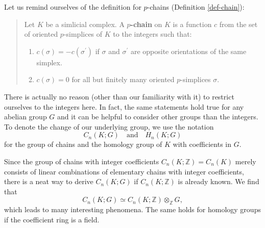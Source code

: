 \documentclass[draft,toc=bib]{scrartcl}
\theoremstyle{plain}
\newtheorem{theorem}{Theorem}[section]
\theoremstyle{definition}
\theoremstyle{remark}
\newcommand{\Z}{\mathbb{Z}}
\newcommand{\qandq}{\quad \text{and} \quad}
\begin{document}
Let us remind ourselves of the definition for $p$-chains (Definition \ref{def-chain}):
\begin{quotation}
	Let $K$ be a simlicial complex. A \textbf{$p$-chain} on $K$ is a function $c$ from the set of oriented $p$-simplices of $K$ to the integers such that:
	\begin{enumerate}
		\item $c(\sigma)=-c(\sigma^\prime)$ if $\sigma$ and $\sigma^\prime$ are opposite orientations of the same simplex.
		\item $c(\sigma)=0$ for all but finitely many oriented $p$-simplices $\sigma$.
	\end{enumerate}
\end{quotation}

There is actually no reason (other than our familiarity with it) to restrict ourselves to the integers here. In fact, the same statements hold true for any abelian group $G$ and it can be helpful to consider other groups than the integers. To denote the change of our underlying group, we use the notation
\[
C_n(K;G)\qandq H_n(K;G)
\]
for the group of chains and the homology group of $K$ with coefficients in $G$.

Since the group of chains with integer coefficients $C_n(K;\Z)=C_n(K)$ merely consists of linear combinations of elementary chains with integer coefficients, there is a neat way to derive $C_n(K;G)$ if $C_n(K;\Z)$ is already known. We find that
\[
C_n(K;G)\simeq C_n(K;\Z)\otimes_\Z G,
\]
which leads to many interesting phenomena. The same holds for homology groups if the coefficient ring is a field.



%
\end{document}
